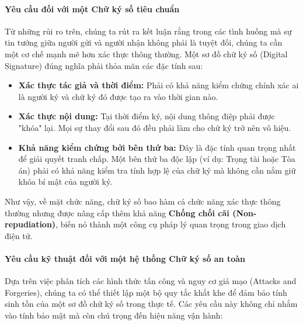 \paragraph*{Yêu cầu đối với một Chữ ký số tiêu chuẩn}
Từ những rủi ro trên, chúng ta rút ra kết luận rằng trong các tình huống mà sự tin tưởng giữa người gửi và người nhận không phải là tuyệt đối, chúng ta cần một cơ chế mạnh mẽ hơn xác thực thông thường. Một sơ đồ chữ ký số (Digital Signature) đúng nghĩa phải thỏa mãn các đặc tính sau:

\begin{itemize}
    \item \textbf{Xác thực tác giả và thời điểm:} Phải có khả năng kiểm chứng chính xác ai là người ký và chữ ký đó được tạo ra vào thời gian nào.
    \item \textbf{Xác thực nội dung:} Tại thời điểm ký, nội dung thông điệp phải được "khóa" lại. Mọi sự thay đổi sau đó đều phải làm cho chữ ký trở nên vô hiệu.
    \item \textbf{Khả năng kiểm chứng bởi bên thứ ba:} Đây là đặc tính quan trọng nhất để giải quyết tranh chấp. Một bên thứ ba độc lập (ví dụ: Trọng tài hoặc Tòa án) phải có khả năng kiểm tra tính hợp lệ của chữ ký mà không cần nắm giữ khóa bí mật của người ký.
\end{itemize}

Như vậy, về mặt chức năng, chữ ký số bao hàm cả chức năng xác thực thông thường nhưng được nâng cấp thêm khả năng \textbf{Chống chối cãi (Non-repudiation)}, biến nó thành một công cụ pháp lý quan trọng trong giao dịch điện tử.

\paragraph*{Yêu cầu kỹ thuật đối với một hệ thống Chữ ký số an toàn}
Dựa trên việc phân tích các hình thức tấn công và nguy cơ giả mạo (Attacks and Forgeries), chúng ta có thể thiết lập một bộ quy tắc khắt khe để đảm bảo tính sinh tồn của một sơ đồ chữ ký số trong thực tế. Các yêu cầu này không chỉ nhắm vào tính bảo mật mà còn chú trọng đến hiệu năng vận hành:

